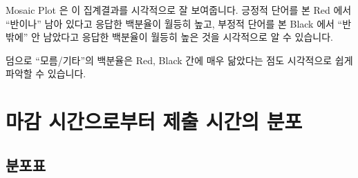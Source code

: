 \documentclass[
]{book}
\begin{document}
Mosaic Plot 은 이 집계결과를 시각적으로 잘 보여줍니다. 긍정적 단어를 본 Red 에서 ``반이나'' 남아 있다고 응답한 백분율이 월등히 높고, 부정적 단어를 본 Black 에서 ``반 밖에'' 안 남았다고 응답한 백분율이 월등히 높은 것을 시각적으로 알 수 있습니다.

덤으로 ``모름/기타''의 백분율은 Red, Black 간에 매우 닮았다는 점도 시각적으로 쉽게 파악할 수 있습니다.

\section{마감 시간으로부터 제출 시간의 분포}\label{uxb9c8uxac10-uxc2dcuxac04uxc73cuxb85cuxbd80uxd130-uxc81cuxcd9c-uxc2dcuxac04uxc758-uxbd84uxd3ec-4}

\subsection{분포표}\label{uxbd84uxd3ecuxd45c-5}
\end{document}
